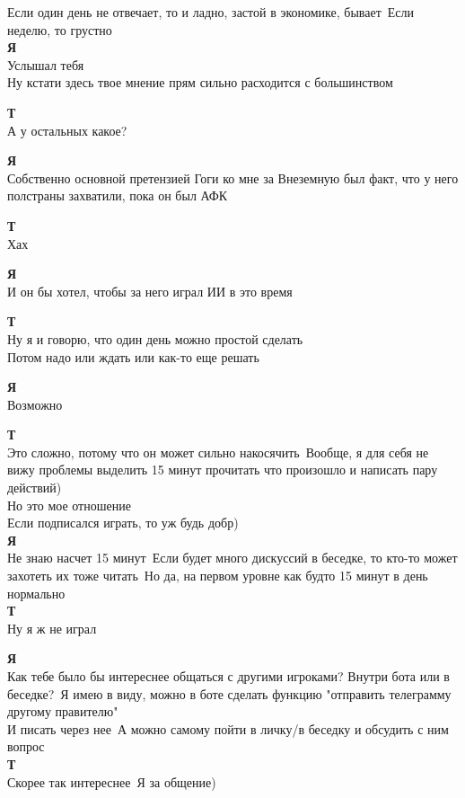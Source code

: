 Если один день не отвечает, то и ладно, застой в экономике, бывает\
Если неделю, то грустно\\

\textbf{Я}\\
Услышал тебя\\
Ну кстати здесь твое мнение прям сильно расходится с большинством

\textbf{Т}\\
А у остальных какое?

\textbf{Я}\\
Собственно основной претензией Гоги ко мне за Внеземную был факт, что у него полстраны захватили, пока он был АФК

\textbf{Т}\\
Хах

\textbf{Я}\\
И он бы хотел, чтобы за него играл ИИ в это время

\textbf{Т}\\
Ну я и говорю, что один день можно простой сделать\\
Потом надо или ждать или как-то еще решать

\textbf{Я}\\
Возможно

\textbf{Т}\\
Это сложно, потому что он может сильно накосячить\
Вообще, я для себя не вижу проблемы выделить 15 минут прочитать что произошло и написать пару действий)\\
Но это мое отношение\\
Если подписался играть, то уж будь добр)\\

\textbf{Я}\\
Не знаю насчет 15 минут\
Если будет много дискуссий в беседке, то кто-то может захотеть их тоже читать\
Но да, на первом уровне как будто 15 минут в день нормально\\

\textbf{Т}\\
Ну я ж не играл

\textbf{Я}\\
Как тебе было бы интереснее общаться с другими игроками? Внутри бота или в беседке?\
Я имею в виду, можно в боте сделать функцию "отправить телеграмму другому правителю"\\
И писать через нее\
А можно самому пойти в личку/в беседку и обсудить с ним вопрос\\

\textbf{Т}\\
Скорее так интереснее\
Я за общение)\\

